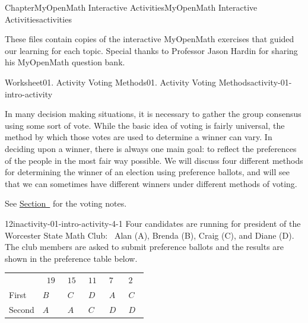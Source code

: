 \documentclass[oneside,10pt,]{book}
\newcommand{\tabularfont}{\relax}
\begin{document}
%
%
\typeout{************************************************}
\typeout{************************************************}
%
\begin{chapterptx}{Chapter}{MyOpenMath Interactive Activities}{}{MyOpenMath Interactive Activities}{}{}{activities}
\renewcommand*{\chaptername}{Chapter}
\begin{introduction}{}%
These files contain copies of the interactive MyOpenMath exercises that guided our learning for each topic. Special thanks to Professor Jason Hardin for sharing his MyOpenMath question bank.%
\end{introduction}%
%
%
\typeout{************************************************}
\typeout{************************************************}
%
\begin{worksheet-section}{Worksheet}{01. Activity Voting Methods}{}{01. Activity Voting Methods}{}{}{activity-01-intro-activity}
\begin{introduction}{}%
In many decision making situations, it is necessary to gather the group consensus using some sort of vote. While the basic idea of voting is fairly universal, the method by which those votes are used to determine a winner can vary. In deciding upon a winner, there is always one main goal: to reflect the preferences of the people in the most fair way possible. We will discuss four different methods for determining the winner of an election using preference ballots, and will see that we can sometimes have different winners under different methods of voting.%
\end{introduction}%
See \hyperref[notes-Voting]{Section~} for the voting notes.%
\begin{divisionexercise}{1}{}{2in}{activity-01-intro-activity-4-1}%
Four candidates are running for president of the Worcester State Math Club:  Alan (A), Brenda (B), Craig (C), and Diane (D). The club members are asked to submit preference ballots and the results are shown in the preference table below.%
\begin{center}%
{\tabularfont%
\begin{tabular}{llllll}
 & \(\displaystyle{19}\) &\(\displaystyle{15}\) &\(\displaystyle{11}\) &\(\displaystyle{7}\) &\(\displaystyle{2}\) \tabularnewline[0pt]
First&\(\displaystyle{B}\) &\(\displaystyle{C}\) &\(\displaystyle{D}\) &\(\displaystyle{A}\) &\(\displaystyle{C}\) \tabularnewline[0pt]
Second&\(\displaystyle{A}\) &\(\displaystyle{A}\) &\(\displaystyle{C}\) &\(\displaystyle{D}\) &\(\displaystyle{D}\) \tabularnewline[0pt]

\end{tabular}}
\end{center}
\end{divisionexercise}
\end{worksheet-section}
\end{chapterptx}
\end{document}
